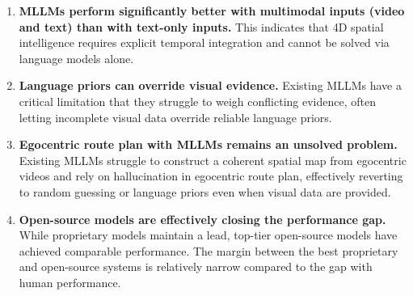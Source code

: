 \begin{enumerate}
  \item{
    \textbf{MLLMs perform significantly better with multimodal inputs (video and text) than with text-only inputs.}
    This indicates that 4D spatial intelligence requires explicit temporal integration and cannot be solved via language models alone.
  }
  \item{
   \textbf{Language priors can override visual evidence.} 
    Existing MLLMs have a critical limitation that they struggle to weigh conflicting evidence, often letting incomplete visual data override reliable language priors.
  }
  \item{
    \textbf{Egocentric route plan with MLLMs remains an unsolved problem.} 
    Existing MLLMs struggle to construct a coherent spatial map from egocentric videos and rely on hallucination in egocentric route plan, effectively reverting to random guessing or language priors even when visual data are provided.
  }
  \item{\textbf{Open-source models are effectively closing the performance gap.} 
    While proprietary models maintain a lead, top-tier open-source models have achieved comparable performance. The margin between the best proprietary and open-source systems is relatively narrow compared to the gap with human performance.
  }
\end{enumerate}
